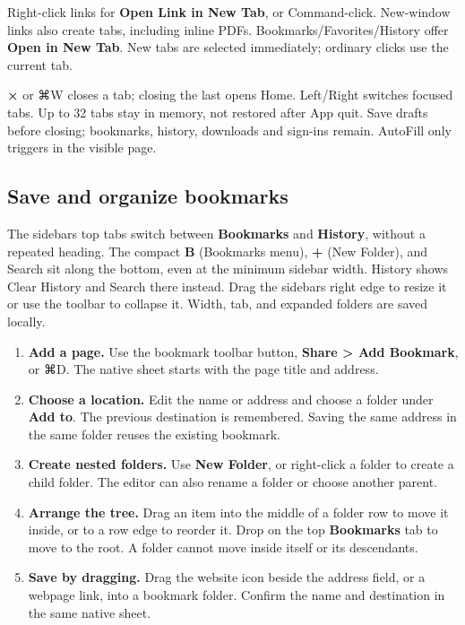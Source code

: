 \documentclass[10pt,letterpaper,oneside]{scrreprt}
\providecommand{\tightlist}{\setlength{\itemsep}{1pt}\setlength{\parskip}{0pt}}
\begin{document}
Right-click links for \textbf{Open Link in New Tab}, or Command-click. New-window links also create tabs, including inline PDFs. Bookmarks/Favorites/History offer \textbf{Open in New Tab}. New tabs are selected immediately; ordinary clicks use the current tab.

\textbf{×} or {{\symbolfont ⌘}W} closes a tab; closing the last opens Home. Left/Right switches focused tabs. Up to 32 tabs stay in memory, not restored after App quit. Save drafts before closing; bookmarks, history, downloads and sign-ins remain. AutoFill only triggers in the visible page.

\subsection{Save and organize bookmarks}\label{save-and-organize-bookmarks}

The sidebar\textquotesingle s top tabs switch between \textbf{Bookmarks} and \textbf{History}, without a repeated heading. The compact \textbf{B} (Bookmarks menu), \textbf{+} (New Folder), and Search sit along the bottom, even at the minimum sidebar width. History shows Clear History and Search there instead. Drag the sidebar\textquotesingle s right edge to resize it or use the toolbar to collapse it. Width, tab, and expanded folders are saved locally.

\begin{enumerate}
\tightlist
\item
  \textbf{Add a page.} Use the bookmark toolbar button, \textbf{Share \textgreater{} Add Bookmark}, or {{\symbolfont ⌘}D}. The native sheet starts with the page title and address.
\item
  \textbf{Choose a location.} Edit the name or address and choose a folder under \textbf{Add to}. The previous destination is remembered. Saving the same address in the same folder reuses the existing bookmark.
\item
  \textbf{Create nested folders.} Use \textbf{New Folder}, or right-click a folder to create a child folder. The editor can also rename a folder or choose another parent.
\item
  \textbf{Arrange the tree.} Drag an item into the middle of a folder row to move it inside, or to a row edge to reorder it. Drop on the top \textbf{Bookmarks} tab to move to the root. A folder cannot move inside itself or its descendants.
\item
  \textbf{Save by dragging.} Drag the website icon beside the address field, or a webpage link, into a bookmark folder. Confirm the name and destination in the same native sheet.
\end{enumerate}
\end{document}
